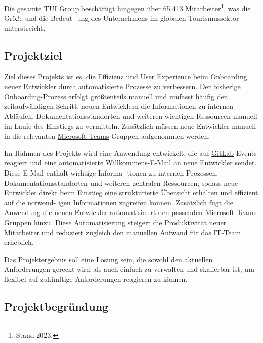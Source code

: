 Die gesamte \hyperlink{TUI}{\textcolor{AOBlau}{TUI}} Group beschäftigt hingegen über 65.413 Mitarbeiter\footnote{Stand 2023.}, was die Größe und die Bedeut-
ung des Unternehmens im globalen Tourismussektor unterstreicht.


\subsection{Projektziel} 
\label{sec:Projektziel}

Ziel dieses Projekts ist es, die Effizienz und \hyperlink{UserExperience}{\textcolor{AOBlau}{User Experience}} beim \hyperlink{Onboarding}{\textcolor{AOBlau}{Onboarding}} neuer Entwickler durch automatisierte Prozesse zu verbessern. Der bisherige \hyperlink{Onboarding}{\textcolor{AOBlau}{Onboarding}}-Prozess erfolgt größtenteils manuell und umfasst häufig den zeitaufwändigen Schritt, neuen Entwicklern die Informationen zu internen Abläufen, Dokumentationsstandorten und weiteren wichtigen Ressourcen manuell im Laufe des Einstiegs zu vermitteln. Zusätzlich müssen neue Entwickler manuell in die relevanten \hyperlink{MicrosoftTeams}{\textcolor{AOBlau}{Microsoft Teams}} Gruppen aufgenommen werden. 

Im Rahmen des Projekts wird eine Anwendung entwickelt, die auf \hyperlink{GitLab}{\textcolor{AOBlau}{GitLab}} Events reagiert und eine automatisierte Willkommens-E-Mail an neue Entwickler sendet. Diese E-Mail enthält wichtige Informa-
tionen zu internen Prozessen, Dokumentationsstandorten und weiteren zentralen Ressourcen, sodass neue Entwickler direkt beim Einstieg eine strukturierte Übersicht erhalten und effizient auf die notwend-
igen Informationen zugreifen können. Zusätzlich fügt die Anwendung die neuen Entwickler automatisie-
rt den passenden \hyperlink{MicrosoftTeams}{\textcolor{AOBlau}{Microsoft Teams}} Gruppen hinzu. Diese Automatisierung steigert die Produktivität neuer Mitarbeiter und reduziert zugleich den manuellen Aufwand für das IT-Team erheblich.

Das Projektergebnis soll eine Lösung sein, die sowohl den aktuellen Anforderungen gerecht wird als auch einfach zu verwalten und skalierbar ist, um flexibel auf zukünftige Anforderungen reagieren zu können.

\subsection{Projektbegründung} 
\label{sec:Projektbegruendung}

